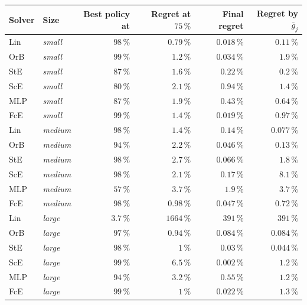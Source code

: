 \begin{tabular}{llrrrr}
\toprule
Solver & Size & Best policy at & Regret at $75\,\%$ & Final regret & Regret by $\bar{g}_j$ \\
\midrule
Lin & \emph{small} & $98\,\%$ & $0.79\,\%$ & $0.018\,\%$ & $0.11\,\%$ \\
OrB & \emph{small} & $99\,\%$ & $1.2\,\%$ & $0.034\,\%$ & $1.9\,\%$ \\
StE & \emph{small} & $87\,\%$ & $1.6\,\%$ & $0.22\,\%$ & $0.2\,\%$ \\
ScE & \emph{small} & $80\,\%$ & $2.1\,\%$ & $0.94\,\%$ & $1.4\,\%$ \\
MLP & \emph{small} & $87\,\%$ & $1.9\,\%$ & $0.43\,\%$ & $0.64\,\%$ \\
FcE & \emph{small} & $99\,\%$ & $1.4\,\%$ & $0.019\,\%$ & $0.97\,\%$ \\
\midrule
Lin & \emph{medium} & $98\,\%$ & $1.4\,\%$ & $0.14\,\%$ & $0.077\,\%$ \\
OrB & \emph{medium} & $94\,\%$ & $2.2\,\%$ & $0.046\,\%$ & $0.13\,\%$ \\
StE & \emph{medium} & $98\,\%$ & $2.7\,\%$ & $0.066\,\%$ & $1.8\,\%$ \\
ScE & \emph{medium} & $98\,\%$ & $2.1\,\%$ & $0.17\,\%$ & $8.1\,\%$ \\
MLP & \emph{medium} & $57\,\%$ & $3.7\,\%$ & $1.9\,\%$ & $3.7\,\%$ \\
FcE & \emph{medium} & $98\,\%$ & $0.98\,\%$ & $0.047\,\%$ & $0.72\,\%$ \\
\midrule
Lin & \emph{large} & $3.7\,\%$ & $1664\,\%$ & $391\,\%$ & $391\,\%$ \\
OrB & \emph{large} & $97\,\%$ & $0.94\,\%$ & $0.084\,\%$ & $0.084\,\%$ \\
StE & \emph{large} & $98\,\%$ & $1\,\%$ & $0.03\,\%$ & $0.044\,\%$ \\
ScE & \emph{large} & $99\,\%$ & $6.5\,\%$ & $0.002\,\%$ & $1.2\,\%$ \\
MLP & \emph{large} & $94\,\%$ & $3.2\,\%$ & $0.55\,\%$ & $1.2\,\%$ \\
FcE & \emph{large} & $99\,\%$ & $1\,\%$ & $0.022\,\%$ & $1.3\,\%$ \\
\bottomrule
\end{tabular}
